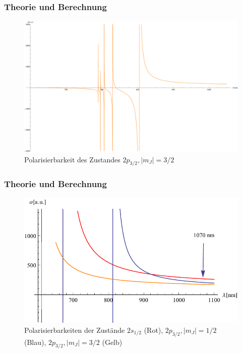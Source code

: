 \documentclass{beamer}
\begin{document}
\begin{frame}
	\frametitle{Theorie und Berechnung}
\begin{center}
	\begin{figure}
                \includegraphics[scale=0.24]{polarizeex2}
           	\caption{Polarisierbarkeit des Zustandes $2p_{3/2}, |m_J|=3/2$}
\end{figure}
\end{center}
\end{frame}
\begin{frame}
	\frametitle{Theorie und Berechnung}
\begin{center}
	\begin{figure}
                \includegraphics[scale=0.7]{alphaalltogether}
           	\caption{Polarisierbarkeiten der Zustände $2s_{1/2}$ (Rot), $2p_{3/2}, |m_J|=1/2$ (Blau), $2p_{3/2}, |m_J|=3/2$ (Gelb) }
\end{figure}
\end{center}
\end{frame}
\end{document}
